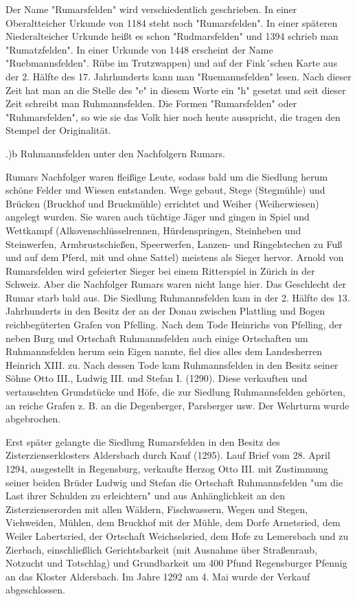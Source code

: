 Der Name "Rumarsfelden" wird verschiedentlich geschrieben. In einer
Oberaltteicher Urkunde von 1184 steht noch "Rumarsfelden". In einer späteren
Niederalteicher Urkunde heißt es schon "Rudmarsfelden" und 1394 schrieb man
"Rumatzfelden". In einer Urkunde von 1448 erscheint der Name "Ruebmannsfelden".
Rübe im Trutzwappen) und auf der Fink´schen Karte aus der 2. Hälfte des 17.
Jahrhunderts kann man "Ruemannsfelden" lesen. Nach dieser Zeit hat man an die
Stelle des "e" in diesem Worte ein "h" gesetzt und seit dieser Zeit schreibt man
Ruhmannsfelden. Die Formen "Rumarsfelden" oder "Ruhmarsfelden", so wie sie das
Volk hier noch heute ausspricht, die tragen den Stempel der Originalität.

.)b Ruhmannsfelden unter den Nachfolgern Rumars.

Rumars Nachfolger waren fleißige Leute, sodass bald um die Siedlung herum schöne
Felder und Wiesen entstanden. Wege gebaut, Stege (Stegmühle) und Brücken
(Bruckhof und Bruckmühle) errichtet und Weiher (Weiherwiesen) angelegt wurden.
Sie waren auch tüchtige Jäger und gingen in Spiel und Wettkampf
(Alkovenschlüsselrennen, Hürdenspringen, Steinheben und Steinwerfen,
Armbrustschießen, Speerwerfen, Lanzen- und Ringelstechen zu Fuß und auf dem
Pferd, mit und ohne Sattel) meistens als Sieger hervor. Arnold von Rumarsfelden
wird gefeierter Sieger bei einem Ritterspiel in Zürich in der Schweiz. Aber die
Nachfolger Rumars waren nicht lange hier. Das Geschlecht der Rumar starb bald
aus. Die Siedlung Ruhmannsfelden kam in der 2. Hälfte des 13. Jahrhunderts in
den Besitz der an der Donau zwischen Plattling und Bogen reichbegüterten Grafen
von Pfelling. Nach dem Tode Heinrichs von Pfelling, der neben Burg und Ortschaft
Ruhmannsfelden auch einige Ortschaften um Ruhmannsfelden herum sein Eigen
nannte, fiel dies alles dem Landesherren Heinrich XIII. zu. Nach dessen Tode kam
Ruhmannsfelden in den Besitz seiner Söhne Otto III., Ludwig III. und Stefan I.
(1290). Diese verkauften und vertauschten Grundstücke und Höfe, die zur Siedlung
Ruhmannsfelden gehörten, an reiche Grafen z. B. an die Degenberger, Parsberger
usw. Der Wehrturm wurde abgebrochen.

Erst später gelangte die Siedlung Rumarsfelden in den Besitz des
Zisterzienserklosters Aldersbach durch Kauf (1295). Lauf Brief vom 28. April
1294, ausgestellt in Regensburg, verkaufte Herzog Otto III. mit Zustimmung
seiner beiden Brüder Ludwig und Stefan die Ortschaft Ruhmannsfelden "um die Last
ihrer Schulden zu erleichtern" und aus Anhänglichkeit an den Zisterzienserorden
mit allen Wäldern, Fischwassern, Wegen und Stegen, Viehweiden, Mühlen, dem
Bruckhof mit der Mühle, dem Dorfe Arnetsried, dem Weiler Labertsried, der
Ortschaft Weichselsried, dem Hofe zu Lemersbach und zu Zierbach, einschließlich
Gerichtsbarkeit (mit Ausnahme über Straßenraub, Notzucht und Totschlag) und
Grundbarkeit um 400 Pfund Regensburger Pfennig an das Kloster Aldersbach. Im
Jahre 1292 am 4. Mai wurde der Verkauf abgeschlossen.

